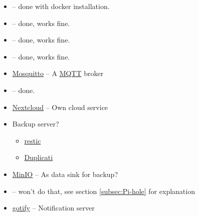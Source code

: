 \begin{figure}[H]
    \begin{itemize}
        \item {} --
              done with docker installation.
        \item {} --
              done, works fine.
        \item {} --
              done, works fine.
        \item {} --
              done, works fine.
        \item \href{https://mosquitto.org/}{Mosquitto} -- A \href{https://mqtt.org/}{MQTT} broker
        \item {} --
              done.
        \item \href{https://nextcloud.com/}{Nextcloud} -- Own cloud service
        \item Backup server?
              \begin{itemize}
                  \item \href{https://restic.net/}{restic}
                  \item \href{https://www.duplicati.com/}{Duplicati}
              \end{itemize}
        \item \href{https://docs.min.io/}{MinIO} -- As data sink for backup?
        \item {} --
              won't do that, see section \ref{subsec:Pi-hole} for explanation
        \item \href{https://gotify.net/}{gotify} -- Notification server
    \end{itemize}
\end{figure}

